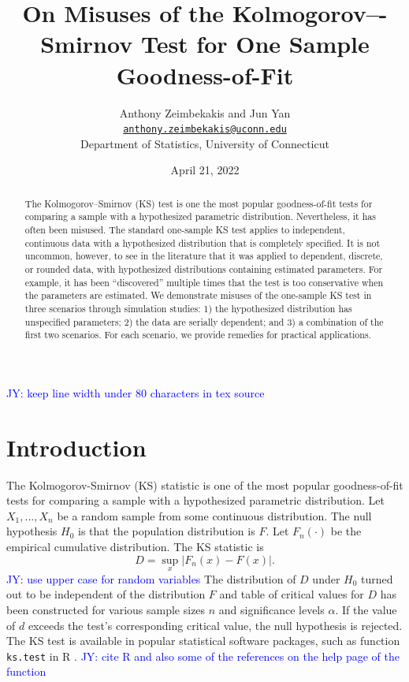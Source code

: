 \documentclass[12pt, letterpaper, titlepage]{article}
\title{On Misuses of the Kolmogorov–-Smirnov Test for One Sample Goodness-of-Fit}
\author{Anthony Zeimbekakis and Jun Yan\\
\href{mailto:anthony.zeimbekakis@uconn.edu}{\nolinkurl{anthony.zeimbekakis@uconn.edu}}\\
Department of Statistics, University of Connecticut}
\date{April 21, 2022}
\newcommand{\jy}[1]{\textcolor{blue}{JY: #1}}
\begin{document}
\maketitle

\doublespace

\begin{abstract}
The Kolmogorov--Smirnov (KS) test is one the most popular goodness-of-fit tests for 
comparing a sample with a hypothesized parametric distribution. Nevertheless, it has 
often been misused. The standard one-sample KS test applies to independent, continuous 
data with a hypothesized distribution that is completely specified. It is not uncommon, 
however, to see in the literature that it was applied to dependent, discrete, or 
rounded data, with hypothesized distributions containing estimated parameters. 
For example, it has been ``discovered'' multiple times that the test is too conservative 
when the parameters are estimated. We demonstrate
misuses of the one-sample KS test in three scenarios through simulation studies:
1) the hypothesized distribution has unspecified parameters;
2) the data are serially dependent; and
3) a combination of the first two scenarios.
For each scenario, we provide remedies for practical applications.
\end{abstract}

\jy{keep line width under 80 characters in tex source}

\section{Introduction}\label{sec:intro}

The Kolmogorov-Smirnov (KS) statistic is one of the most popular goodness-of-fit 
tests for comparing a sample with a hypothesized parametric distribution.
Let $X_1, ..., X_n$ be a random sample from some continuous
distribution. The null hypothesis $H_0$ is that the population distribution is $F$.
Let $F_n(\cdot)$ be the empirical cumulative distribution. The KS statistic is
\[
  D = \sup_x {\lvert F_{n}(x) - F(x) \rvert}.
\]
\jy{use upper case for random variables}
The distribution of $D$ under $H_0$ turned out to be independent of the
distribution $F$ and  table of critical values for $D$ has been constructed
\citet{Massey} for various sample sizes $n$ and significance 
levels $\alpha$. If the value of $d$ exceeds the test's corresponding critical value, 
the null hypothesis is rejected. The KS test is available in popular statistical
software packages, such as function \texttt{ks.test} in R \citep{R}.
\jy{cite R and also some of the references on the help page of the function}
\end{document}
